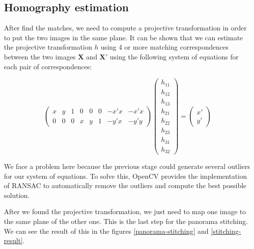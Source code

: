 \documentclass[journal]{IEEEtran}
\begin{document}
\subsection{Homography estimation}

After find the matches, we need to compute a projective transformation
in order to put the two images in the same plane. It can be shown that we
can estimate the projective transformation $h$ using 4 or more matching
correspondences between the two images $\mathbf{X}$ and $\mathbf{X'}$ using the following
system of equations for each pair of correspondences:

\[
\begin{pmatrix}
  x & y & 1 & 0 & 0 & 0 & -x'x & -x'x \\
  0 & 0 & 0 & x & y & 1 & -y'x & -y'y
\end{pmatrix}
\begin{pmatrix}
  h_{11} \\
  h_{12} \\
  h_{13} \\
  h_{21} \\
  h_{22} \\
  h_{23} \\
  h_{31} \\
  h_{32}
\end{pmatrix}
 = \begin{pmatrix}
  x' \\
  y'
\end{pmatrix}
\]

We face a problem here because the previous stage could generate several
outliers for our system of equations. To solve this, OpenCV provides
the implementation of RANSAC \cite{wiki:ransac} to automatically remove
the outliers and compute the best possible solution.

After we found the projective transformation, we just need to map one image to
the same plane of the other one. This is the last step for the panorama
stitching. We can see the result of this in the figures \ref{panorama-stitching}
and \ref{stitching-result}.
\end{document}
